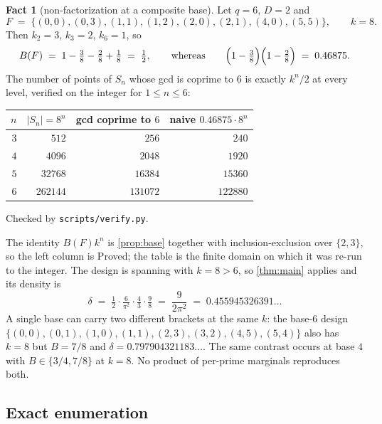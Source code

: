 \documentclass[11pt]{amsart}
\theoremstyle{definition}
\newtheorem{fact}[theorem]{Fact}
\theoremstyle{remark}
\begin{document}
\begin{fact}[non-factorization at a composite base]
\label{fact:factor}
Let $q=6$, $D=2$ and
\[
  F \;=\; \{(0,0),(0,3),(1,1),(1,2),(2,0),(2,1),(4,0),(5,5)\},
  \qquad k = 8 .
\]
Then $k_2 = 3$, $k_3 = 2$, $k_6 = 1$, so
\[
  B(F) \;=\; 1 - \tfrac38 - \tfrac28 + \tfrac18 \;=\; \tfrac12,
  \qquad\text{whereas}\qquad
  \Bigl(1-\tfrac38\Bigr)\Bigl(1-\tfrac28\Bigr) \;=\; 0.46875 .
\]
The number of points of $S_n$ whose gcd is coprime to $6$ is exactly $k^{n}/2$ at every level, verified on the integer for $1 \le n \le 6$:
\begin{center}
\begin{tabular}{rrrr}
\toprule
$n$ & $|S_n| = 8^{n}$ & gcd coprime to $6$ & naive $0.46875 \cdot 8^{n}$ \\
\midrule
$3$ & $512$ & $256$ & $240$ \\
$4$ & $4096$ & $2048$ & $1920$ \\
$5$ & $32768$ & $16384$ & $15360$ \\
$6$ & $262144$ & $131072$ & $122880$ \\
\bottomrule
\end{tabular}
\end{center}
Checked by \texttt{scripts/verify.py}.
\end{fact}

The identity $B(F)k^n$ is \cref{prop:base} together with inclusion-exclusion over $\{2,3\}$, so the left column is Proved; the table is the finite domain on which it was re-run to the integer. The design is spanning with $k=8>6$, so \cref{thm:main} applies and its density is
\[
  \delta \;=\; \tfrac12 \cdot \tfrac{6}{\pi^{2}} \cdot \tfrac{4}{3} \cdot \tfrac{9}{8}
  \;=\; \frac{9}{2\pi^{2}} \;=\; 0.455945326391\ldots
\]
A single base can carry two different brackets at the same $k$: the base-$6$ design $\{(0,0),(0,1),(1,0),(1,1),(2,3),(3,2),(4,5),(5,4)\}$ also has $k=8$ but $B=7/8$ and $\delta = 0.797904321183\ldots$. The same contrast occurs at base $4$ with $B \in \{3/4, 7/8\}$ at $k=8$. No product of per-prime marginals reproduces both.

\subsection{Exact enumeration}
\end{document}
